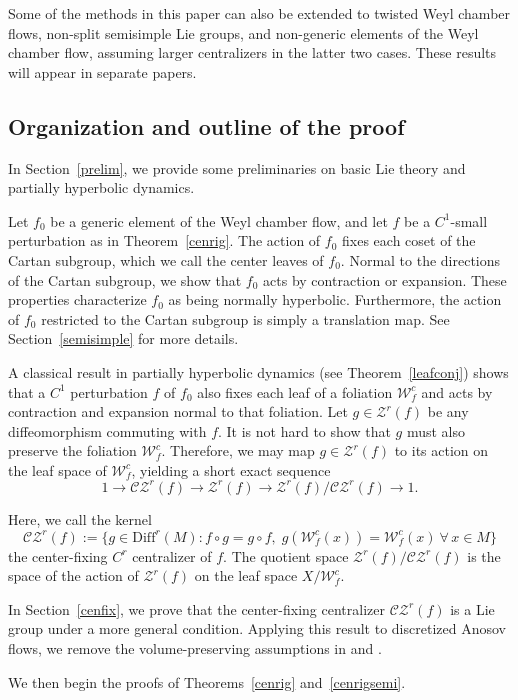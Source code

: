 \documentclass[11pt]{amsart}
\numberwithin{equation}{section}
\newcommand{\W}{\mathcal{W}}
\newcommand{\CZ}{\mathcal{CZ}}
\theoremstyle{plain}
\begin{document}
Some of the methods in this paper can also be extended to twisted Weyl chamber flows, non-split semisimple Lie groups, and non-generic elements of the Weyl chamber flow, assuming larger centralizers in the latter two cases. These results will appear in separate papers.

\subsection{Organization and outline of the proof}\label{outl}

In Section~\ref{prelim}, we provide some preliminaries on basic Lie theory and partially hyperbolic dynamics.

Let $f_0$ be a generic element of the Weyl chamber flow, and let $f$ be a $C^1$-small perturbation as in Theorem~\ref{cenrig}. The action of $f_0$ fixes each coset of the Cartan subgroup, which we call the center leaves of $f_0$. Normal to the directions of the Cartan subgroup, we show that $f_0$ acts by contraction or expansion. These properties characterize $f_0$ as being normally hyperbolic. Furthermore, the action of $f_0$ restricted to the Cartan subgroup is simply a translation map. See Section~\ref{semisimple} for more details.

A classical result in partially hyperbolic dynamics (see Theorem~\ref{leafconj}) shows that a $C^1$ perturbation $f$ of $f_0$ also fixes each leaf of a foliation $\W^c_f$ and acts by contraction and expansion normal to that foliation. Let $g\in \mathcal{Z}^r(f)$ be any diffeomorphism commuting with $f$. It is not hard to show that $g$ must also preserve the foliation $\W^c_f$. Therefore, we may map $g\in \mathcal{Z}^r(f)$ to its action on the leaf space of $\W^c_f$, yielding a short exact sequence
\[
1\to \CZ^r(f)\to \mathcal{Z}^r(f)\to \mathcal{Z}^r(f)/\CZ^r(f)\to 1.
\]

Here, we call the kernel
\[
\CZ^r(f):=\{g\in \mathrm{Diff}^r(M): f\circ g=g\circ f,\; g(\W_f^c(x))=\W_f^c(x)\ \forall\, x\in M\}
\]
the center-fixing $C^r$ centralizer of $f$. The quotient space $\mathcal{Z}^r(f)/\CZ^r(f)$ is the space of the action of $\mathcal{Z}^r(f)$ on the leaf space $X/\W^c_f$.

In Section~\ref{cenfix}, we prove that the center-fixing centralizer $\CZ^r(f)$ is a Lie group under a more general condition. Applying this result to discretized Anosov flows, we remove the volume-preserving assumptions in \cite{DWX} and \cite{BG}.

We then begin the proofs of Theorems~\ref{cenrig} and~\ref{cenrigsemi}.
\end{document}
